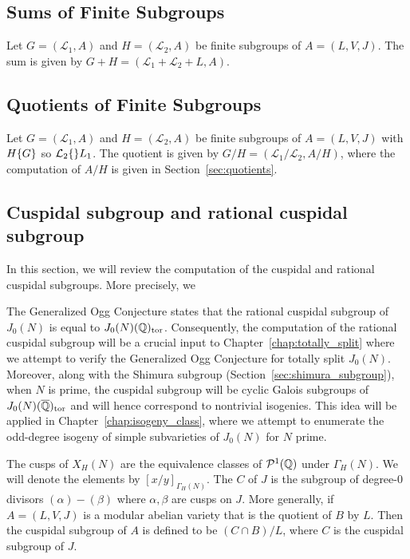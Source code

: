 \subsection{Sums of Finite Subgroups}

Let $G=(\mathcal{L}_1, A)$ and $H=(\mathcal{L}_2, A)$ be finite subgroups of
$A=(L, V, J)$. The sum is given by $G+H=(\mathcal{L}_1 + \mathcal{L}_2+L, A)$.

\subsection{Quotients of Finite Subgroups}

Let $G=(\mathcal{L}_1, A)$ and $H=(\mathcal{L}_2, A)$ be finite subgroups of
$A=(L, V, J)$ with $H\{G\}$ so $\mathcal{L}_2\{\mathcal\}{L}_1$. The quotient
is given by $G/H=(\mathcal{L}_1/\mathcal{L}_2, A/H)$, where the computation of
$A/H$ is given in Section~\ref{sec:quotients}.

\subsection{Cuspidal subgroup and rational cuspidal subgroup}%
\label{sub:cuspidal}

In this section, we will review the computation of the cuspidal and rational
cuspidal subgroups. More precisely, we %

The Generalized Ogg Conjecture states that the rational
cuspidal subgroup of $J_0(N)$ is equal to $J_0(N)(\mathbb{Q})_{\mathrm{tor}}$. Consequently, the
computation of the rational cuspidal subgroup will be a crucial input to
Chapter~\ref{chap:totally_split} where we attempt to verify the Generalized Ogg
Conjecture for totally split $J_0(N)$. Moreover, along with the Shimura
subgroup (Section~\ref{sec:shimura_subgroup}), when $N$ is prime, the cuspidal
subgroup will be cyclic Galois subgroups of $J_0(N)(\overline{\mathbb{Q}})_{\mathrm{tor}}$ and will
hence correspond to nontrivial isogenies. This idea will be applied in
Chapter~\ref{chap:isogeny_class}, where we attempt to enumerate the odd-degree
isogeny of simple subvarieties of $J_0(N)$ for $N$ prime.

The cusps of $X_H(N)$ are the equivalence classes of $\mathcal{P}^1(\mathbb{Q})$ under
$\Gamma_H(N)$. We will denote the elements by $[x/y]_{\Gamma_H(N)}$. The
 $C$ of $J$ is the subgroup of degree-0 divisors
$(\alpha)-(\beta)$ where $\alpha, \beta$ are cusps on $J$. More generally, if
$A=(L, V, J)$ is a modular abelian variety that is the quotient of $B$ by $L$.
Then the cuspidal subgroup of $A$ is defined to be $(C\cap B)/L$, where $C$ is
the cuspidal subgroup of $J$.


